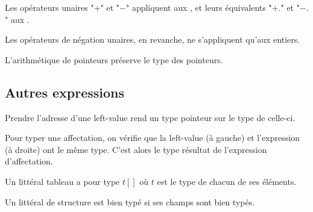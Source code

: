 \begin{mathpar}
\end{mathpar}


Les opérateurs unaires "$+$" et "$-$" appliquent aux \tInt, et leurs équivalents
"$+.$" et "$-.$" aux \tFloat.


Les opérateurs de négation unaires, en revanche, ne s'appliquent qu'aux
entiers.

\begin{mathpar}
\end{mathpar}

L'arithmétique de pointeurs préserve le type des pointeurs.

\begin{mathpar}
\end{mathpar}

\subsection*{Autres expressions}

Prendre l'adresse d'une left-value rend un type pointeur sur le type de
celle-ci.

\begin{mathpar}
\end{mathpar}

Pour typer une affectation, on vérifie que la left-value (à gauche) et
l'expression (à droite) ont le même type. C'est alors le type résultat de
l'expression d'affectation.

\begin{mathpar}
\end{mathpar}

Un littéral tableau a pour type $t[]$ où $t$ est le type de chacun de ses
éléments.

\begin{mathpar}
\end{mathpar}

Un littéral de structure est bien typé si ses champs sont bien typés.

\begin{mathpar}
\end{mathpar}

